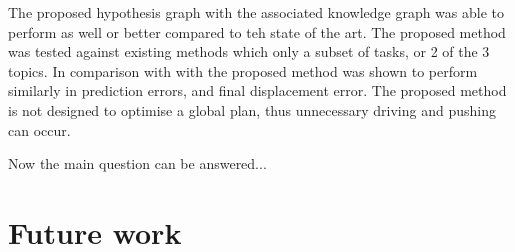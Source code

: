 The proposed hypothesis graph with the associated knowledge graph was able to perform as well or better compared to teh state of the art. The proposed method was tested against existing methods which only a subset of tasks, or 2 of the 3 topics. In comparison with with\cite{sabbaghnovin_model_2021} the proposed method was shown to perform similarly in prediction errors, and final displacement error. The proposed method is not designed to optimise a global plan, thus unnecessary driving and pushing can occur. 
\vspace{\baselineskip}

Now the main question can be answered...

\section{Future work}%
\label{sec:future_work}

